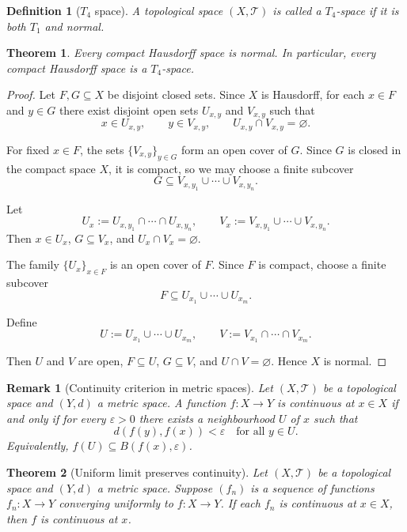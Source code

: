 \documentclass[12pt]{article}
\newtheorem{theorem}{Theorem}
\newtheorem{definition}{Definition}
\newtheorem{remark}{Remark}
\begin{document}
\begin{definition}[$T_4$ space]
A topological space $(X,\mathcal{T})$ is called a \emph{$T_4$-space} if it is both $T_1$ and normal.
\end{definition}

\begin{theorem}
Every compact Hausdorff space is normal. In particular, every compact Hausdorff space is a $T_4$-space.
\end{theorem}

\begin{proof}[Proof]
Let $F,G \subseteq X$ be disjoint closed sets. Since $X$ is Hausdorff, for each $x \in F$ and $y \in G$ there exist disjoint open sets $U_{x,y}$ and $V_{x,y}$ such that
\[
x \in U_{x,y}, \qquad y \in V_{x,y}, \qquad U_{x,y} \cap V_{x,y} = \varnothing.
\]

For fixed $x \in F$, the sets $\{V_{x,y}\}_{y \in G}$ form an open cover of $G$. Since $G$ is closed in the compact space $X$, it is compact, so we may choose a finite subcover
\[
G \subseteq V_{x,y_1} \cup \cdots \cup V_{x,y_n}.
\]

Let
\[
U_x := U_{x,y_1} \cap \cdots \cap U_{x,y_n}, 
\qquad
V_x := V_{x,y_1} \cup \cdots \cup V_{x,y_n}.
\]
Then $x \in U_x$, $G \subseteq V_x$, and $U_x \cap V_x = \varnothing$.

The family $\{U_x\}_{x \in F}$ is an open cover of $F$. Since $F$ is compact, choose a finite subcover
\[
F \subseteq U_{x_1} \cup \cdots \cup U_{x_m}.
\]

Define
\[
U := U_{x_1} \cup \cdots \cup U_{x_m},
\qquad
V := V_{x_1} \cap \cdots \cap V_{x_m}.
\]

Then $U$ and $V$ are open, $F \subseteq U$, $G \subseteq V$, and $U \cap V = \varnothing$. Hence $X$ is normal.
\end{proof}

\begin{remark}[Continuity criterion in metric spaces]
Let $(X,\mathcal{T})$ be a topological space and $(Y,d)$ a metric space. 
A function $f:X\to Y$ is continuous at $x\in X$ if and only if for every $\varepsilon>0$ there exists a neighbourhood $U$ of $x$ such that
\[
d(f(y),f(x)) < \varepsilon \quad \text{for all } y\in U.
\]
Equivalently, $f(U) \subseteq B(f(x),\varepsilon)$.
\end{remark}

\begin{theorem}[Uniform limit preserves continuity]
Let $(X,\mathcal{T})$ be a topological space and $(Y,d)$ a metric space. 
Suppose $(f_n)$ is a sequence of functions $f_n:X\to Y$ converging uniformly to $f:X\to Y$. 
If each $f_n$ is continuous at $x\in X$, then $f$ is continuous at $x$.
\end{theorem}
\end{document}
